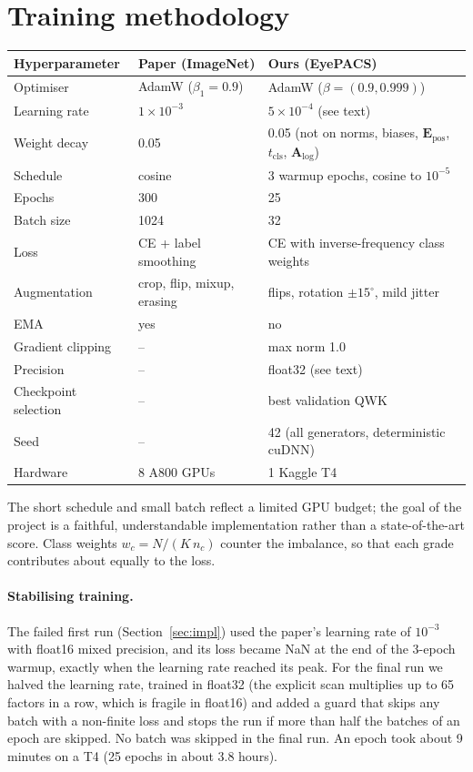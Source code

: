 \documentclass[11pt,a4paper]{article}
\begin{document}
\section{Training methodology}

\begin{center}
\begin{tabular}{p{3.6cm}p{4.2cm}p{6.4cm}}
\toprule
Hyperparameter & Paper (ImageNet) & Ours (EyePACS) \\
\midrule
Optimiser          & AdamW ($\beta_1=0.9$) & AdamW ($\beta=(0.9, 0.999)$) \\
Learning rate      & $1\times10^{-3}$ & $5\times10^{-4}$ (see text) \\
Weight decay       & 0.05 & 0.05 (not on norms, biases, $\mathbf{E}_{\mathrm{pos}}$, $t_{\mathrm{cls}}$, $\mathbf{A}_{\log}$) \\
Schedule           & cosine & 3 warmup epochs, cosine to $10^{-5}$ \\
Epochs             & 300 & 25 \\
Batch size         & 1024 & 32 \\
Loss               & CE + label smoothing & CE with inverse-frequency class weights \\
Augmentation       & crop, flip, mixup, erasing & flips, rotation $\pm15^\circ$, mild jitter \\
EMA                & yes & no \\
Gradient clipping  & -- & max norm 1.0 \\
Precision          & -- & float32 (see text) \\
Checkpoint selection & -- & best validation QWK \\
Seed               & -- & 42 (all generators, deterministic cuDNN) \\
Hardware           & 8 A800 GPUs & 1 Kaggle T4 \\
\bottomrule
\end{tabular}
\end{center}

The short schedule and small batch reflect a limited GPU budget; the goal of the
project is a faithful, understandable implementation rather than a state-of-the-art
score. Class weights $w_c = N/(K\,n_c)$ counter the imbalance, so that each grade
contributes about equally to the loss.

\paragraph{Stabilising training.} The failed first run (Section~\ref{sec:impl}) used the paper's
learning rate of $10^{-3}$ with float16 mixed precision, and its loss became NaN at
the end of the 3-epoch warmup, exactly when the learning rate reached its peak. For
the final run we halved the learning rate, trained in float32 (the explicit scan
multiplies up to 65 factors in a row, which is fragile in float16) and added a
guard that skips any batch with a non-finite loss and stops the run if more than
half the batches of an epoch are skipped. No batch was skipped in the final run.
An epoch took about 9 minutes on a T4 (25 epochs in about 3.8 hours).
\end{document}
